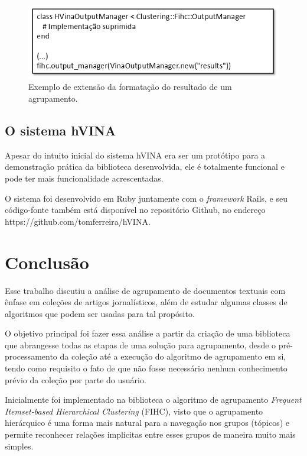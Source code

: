 \documentclass[a4paper,12pt]{article}
\begin{document}
\begin{figure}[H]
    \begin{center}
        \includegraphics[scale=0.6]{exemplo_formatacao.png}
    \end{center}
    \caption{Exemplo de extensão da formatação do resultado de um agrupamento.}
    \label{fig:exemplo_formatacao}
\end{figure}

\subsection {O sistema hVINA}
\label {sec:o_sistema_hvina}

Apesar do intuito inicial do sistema hVINA era ser um protótipo para a demonstração prática da biblioteca desenvolvida, ele é totalmente funcional e pode ter mais funcionalidade acrescentadas. 

O sistema foi desenvolvido em Ruby juntamente com o \emph{framework} Rails, e seu código-fonte também está disponível no repositório Github, no endereço https://github.com/tomferreira/hVINA.


\newpage

\section {Conclusão}
\label {sec:conclusao}

Esse trabalho discutiu a análise de agrupamento de documentos textuais com ênfase em coleções de artigos jornalísticos, além de estudar algumas classes de algoritmos que podem ser usadas para tal propósito.

O objetivo principal foi fazer essa análise a partir da criação de uma biblioteca que abrangesse todas as etapas de uma solução para agrupamento, desde o pré-processamento da coleção até a execução do algoritmo de agrupamento em si, tendo como requisito o fato de que não fosse necessário nenhum conhecimento prévio da coleção por parte do usuário.

Inicialmente foi implementado na biblioteca o algoritmo de agrupamento \textit{Frequent Itemset-based Hierarchical Clustering} (FIHC), visto que o agrupamento hierárquico é uma forma mais natural para a navegação nos grupos (tópicos) e permite reconhecer relações implícitas entre esses grupos de maneira muito mais simples.
\end{document}
